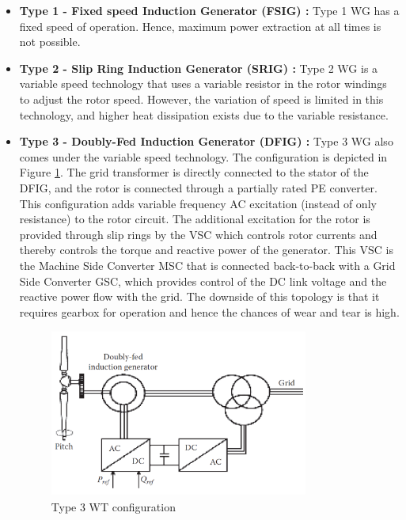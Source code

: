 \begin{itemize}
    \item \textbf{Type 1 - Fixed speed Induction Generator (FSIG) :} Type 1 \gls{WG} has a fixed speed of operation. Hence, maximum power extraction at all times is not possible.
    \item \textbf{Type 2 - Slip Ring Induction Generator (SRIG) :} Type 2 \gls{WG} is a variable speed technology that uses a variable resistor in the rotor windings to adjust the rotor speed. However, the variation of speed is limited in this technology, and higher heat dissipation exists due to the variable resistance.
    \item \textbf{Type 3 - Doubly-Fed Induction Generator (DFIG) :} Type 3 \gls{WG} also comes under the variable speed technology. The configuration is depicted in Figure \ref{fig:Type3}. The grid transformer is directly connected to the stator of the DFIG, and the rotor is connected through a partially rated \gls{PE} converter. This configuration adds variable frequency \gls{AC} excitation (instead of only resistance) to the rotor circuit. The additional excitation for the rotor is provided through slip rings by the \gls{VSC} which controls rotor currents and thereby controls the torque and reactive power of the generator. This \gls{VSC} is the Machine Side Converter \gls{MSC} that is connected back-to-back with a Grid Side Converter \gls{GSC}, which provides control of the \gls{DC} link voltage and the reactive power flow with the grid. The downside of this topology is that it requires gearbox for operation and hence the chances of wear and tear is high.
    
    \begin{figure}[H]
\centering
    \includegraphics[height = 5.5cm,width = 8.5cm]{Diagrams/Chapter_2/Type3WT_1.PNG}
    \caption{Type 3 WT configuration \cite{ali_wind_2012}}
    \label{fig:Type3}
\end{figure}
    

\end{itemize}

